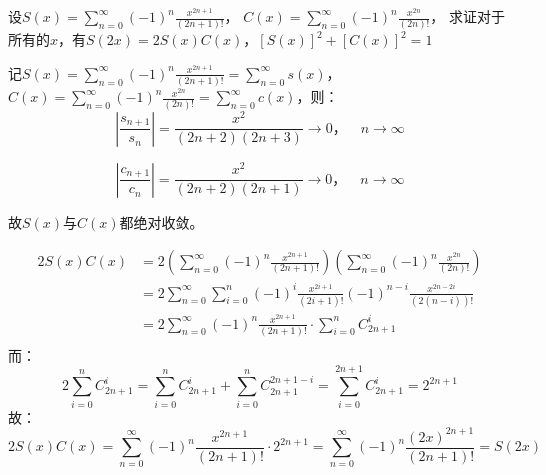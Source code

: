 \begin{problem}
    设\(S(x) = \sum_{n=0}^{\infty} (-1)^n \frac{x^{2n+1}}{(2n+1)!}\)，
    \(C(x) = \sum_{n=0}^{\infty} (-1)^n \frac{x^{2n}}{(2n)!}\)，
    求证对于所有的\(x\)，有\(S(2x)=2S(x)C(x)\)，\([S(x)]^2+[C(x)]^2=1\)
\end{problem}


\begin{solution}
    记\(S(x) = \sum_{n=0}^{\infty} (-1)^n \frac{x^{2n+1}}{(2n+1)!} =
    \sum_{n=0}^{\infty} s(x)\)，\(C(x) = \sum_{n=0}^{\infty} (-1)^n
    \frac{x^{2n}}{(2n)!} = \sum_{n=0}^{\infty} c(x)\)，则：
    \[
        \left\vert \frac{s_{n+1}}{s_{n}} \right\vert =
        \frac{x^2}{(2n+2)(2n+3)} \to 0，\quad n \to \infty
    \]

    \[
        \left\vert \frac{c_{n+1}}{c_{n}} \right\vert =
        \frac{x^2}{(2n+2)(2n+1)} \to 0，\quad n \to \infty
    \]

    故\(S(x)\)与\(C(x)\)都绝对收敛。

    \begin{align*}
        2S(x)C(x) & = 2\left( \sum_{n=0}^{\infty} (-1)^n
        \frac{x^{2n+1}}{(2n+1)!} \right)  \left(
            \sum_{n=0}^{\infty} (-1)^n
        \frac{x^{2n}}{(2n)!} \right)
        \\
        & = 2 \sum_{n=0}^{\infty} \sum_{i=0}^{n} (-1)^{i}
        \frac{x^{2i+1}}{(2i+1)!} (-1)^{n-i}
        \frac{x^{2n-2i}}{(2(n-i))!}           \\
        & = 2 \sum_{n=0}^{\infty} (-1)^n
        \frac{x^{2n+1}}{(2n+1)!} \cdot
        \sum_{i=0}^{n} C^{i}_{2n+1}
        \\
    \end{align*}
    而：
    \[
        2 \sum_{i=0}^{n} C^{i}_{2n+1} = \sum_{i=0}^{n} C^{i}_{2n+1} +
        \sum_{i=0}^{n} C^{2n+1-i}_{2n+1}  = \sum_{i=0}^{2n+1}
        C^{i}_{2n+1} = 2^{2n+1}
    \]
    故：
    \[
        2S(x)C(x) = \sum_{n=0}^{\infty} (-1)^n
        \frac{x^{2n+1}}{(2n+1)!}
        \cdot 2^{2n+1} = \sum_{n=0}^{\infty} (-1)^n
        \frac{(2x)^{2n+1}}{(2n+1)!} = S(2x)
    \]


\end{solution}
